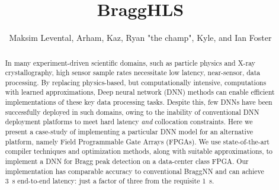 \documentclass[sigconf,techreport]{acmart}
\begin{document}
\title{BraggHLS}


\author{Maksim Levental, Arham, Kaz, Ryan "the champ", Kyle, and Ian Foster}

\renewcommand{\shortauthors}{Levental et al.}


\begin{abstract}
	In many experiment-driven scientific domains, such as particle physics and X-ray crystallography, high sensor sample rates necessitate low latency, near-sensor, data processing.
	By replacing physics-based, but computationally intensive, computations with learned approximations, Deep neural network (DNN) methods can enable efficient implementations of these key data processing tasks.
	Despite this, few DNNs have been successfully deployed in such domains, owing to the inability of conventional DNN deployment platforms to meet hard latency \emph{and} collocation constraints.
	Here we present a case-study of implementing a particular DNN model for an alternative platform, namely Field Programmable Gate Arrays (FPGAs).
	We use state-of-the-art compiler techniques and optimization methods, along with suitable approximations, to implement a DNN for Bragg peak detection on a data-center class FPGA.
	Our implementation has comparable accuracy to conventional BraggNN and can achieve 3~\textmu s end-to-end latency: just a factor of three from the requisite 1~\textmu s.
\end{abstract}




\end{document}
